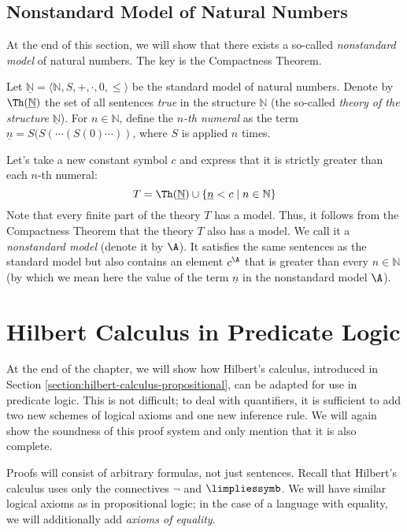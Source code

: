 \subsection{Nonstandard Model of Natural Numbers}

At the end of this section, we will show that there exists a so-called \emph{nonstandard model} of natural numbers. The key is the Compactness Theorem.
    
Let $\underline{\mathbb N}=\langle\mathbb N,S,+,\cdot,0,\leq\rangle$ be the standard model of natural numbers. Denote by $\Th(\underline{\mathbb N})$ the set of all sentences \emph{true} in the structure $\underline{\mathbb N}$ (the so-called \emph{theory of the structure} $\underline{\mathbb N}$). For $n\in \mathbb N$, define the \emph{$n$-th numeral} as the term $\underline n=S(S(\cdots (S(0)\cdots))$, where $S$ is applied $n$ times.

Let's take a new constant symbol $c$ and express that it is strictly greater than each $n$-th numeral:
$$
T=\Th(\underline{\mathbb N})\cup\{\underline n<c\mid n\in \mathbb N\}
$$
Note that every finite part of the theory $T$ has a model. Thus, it follows from the Compactness Theorem that the theory $T$ also has a model. We call it a \emph{nonstandard model} (denote it by $\A$). It satisfies the same sentences as the standard model but also contains an element $c^\A$ that is greater than every $n\in \mathbb N$ (by which we mean here the value of the term $\underline n$ in the nonstandard model $\A$).
    

\section{Hilbert Calculus in Predicate Logic}

At the end of the chapter, we will show how Hilbert's calculus, introduced in Section \ref{section:hilbert-calculus-propositional}, can be adapted for use in predicate logic. This is not difficult; to deal with quantifiers, it is sufficient to add two new schemes of logical axioms and one new inference rule. We will again show the soundness of this proof system and only mention that it is also complete.

Proofs will consist of arbitrary formulas, not just sentences. Recall that Hilbert's calculus uses only the connectives $\neg$ and $\limpliessymb$. We will have similar logical axioms as in propositional logic; in the case of a language with equality, we will additionally add \emph{axioms of equality}. 

